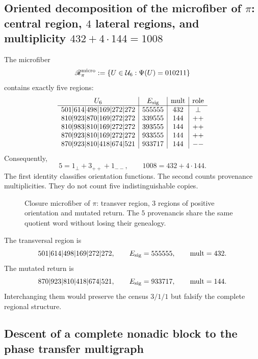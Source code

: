 \subsection{Oriented decomposition of the microfiber of \texorpdfstring{\(\pi\)}{pi}: central region, \(4\) lateral regions, and multiplicity \texorpdfstring{\(432+4\cdot144=1008\)}{432+4x144=1008}}

The microfiber
\[
 \mathscr R_\pi^{\rm micro}
 :=\{U\in\mathcal U_6:\Psi(U)=010211\}
\]
contains exactly five regions:
\[
\begin{array}{c|c|c|c}
U_6&E_{\rm sig}&\operatorname{mult}&\text{role}\\ \hline
501|614|498|169|272|272&555555&432&\perp\\
810|923|870|169|272|272&339555&144&++\\
810|983|810|169|272|272&393555&144&++\\
870|923|810|169|272|272&933555&144&++\\
870|923|810|418|674|521&933717&144&--
\end{array}
\]
Consequently,
\begin{equation}
 \boxed{
 5=1_\perp+3_{++}+1_{--},
 \qquad
 1008=432+4\cdot144.}
 \label{p12-83-c8-s1:eq:descomposiciones-cinco-regiones-pi}
\end{equation}
The first identity classifies orientation functions. The second counts
provenance multiplicities. They do not count five indistinguishable copies.

\begin{figure}[htbp]
\centering
\resizebox{\textwidth}{!}{}
\caption{Closure microfiber of \(\pi\): transver region,
\(3\) regions of positive orientation and mutated return. The \(5\)
provenancis share the same quotient word without losing their genealogy.}
\label{fig:cinco-regiones-pi-microfibra-canonica}
\end{figure}

The transversal region is
\[
 501|614|498|169|272|272,
 \qquad E_{\rm sig}=555555,
 \qquad\operatorname{mult}=432.
\]
The mutated return is
\[
 870|923|810|418|674|521,
 \qquad E_{\rm sig}=933717,
 \qquad\operatorname{mult}=144.
\]
Interchanging them would preserve the census \(3/1/1\) but falsify the complete
regional structure.

\subsection{Descent of a complete nonadic block to the phase transfer multigraph}

